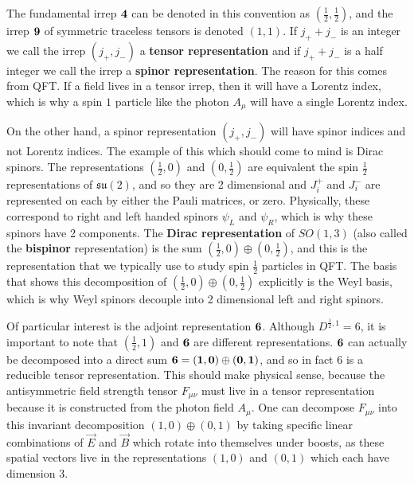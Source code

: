 \documentclass[11pt, oneside]{article}   	%
\theoremstyle{definition}
\begin{document}
The fundamental irrep $\bf 4$ can be denoted in this convention as $(\frac{1}{2}, \frac{1}{2})$, and the irrep 
$\bf 9$ of symmetric traceless tensors is denoted $(1, 1)$. If $j_+ + j_-$ is an integer we call the irrep $(j_+, j_-)$ a \textbf{tensor 
representation} and if $j_+ + j_-$ is a half integer we call the irrep a \textbf{spinor representation}. The reason for this comes 
from QFT. If a field lives in a tensor irrep, then it will have a Lorentz index, which is why a spin $1$ particle like the photon 
$A_\mu$ will have a single Lorentz index. 

On the other hand, a spinor representation $(j_+, j_-)$ will have spinor indices and not Lorentz indices. The example of this 
which should come to mind is Dirac spinors. The representations $(\frac{1}{2}, 0)$ and $(0, \frac{1}{2})$ are equivalent 
the spin $\frac{1}{2}$ representations of $\mathfrak{su}(2)$, and so they are 2 dimensional and $J_i^+$ and $J_i^-$ 
are represented on each by either the Pauli matrices, or zero. Physically, these correspond to right and left handed 
spinors $\psi_L$ and $\psi_R$, which is why these spinors have 2 components. The \textbf{Dirac representation} 
of $SO(1, 3)$ (also called the \textbf{bispinor} representation) is the sum $(\frac{1}{2}, 0)\oplus (0, \frac{1}{2})$, 
and this is the representation that we typically use to study spin $\frac{1}{2}$ particles in QFT. The basis that shows 
this decomposition of $(\frac{1}{2}, 0)\oplus (0, \frac{1}{2})$ explicitly is the Weyl basis, which is why Weyl spinors 
decouple into 2 dimensional left and right spinors. 

Of particular interest is the adjoint representation $\bf 6$. Although $D^{\frac{1}{2}, 1} = 6$, it is important to note that 
$(\frac{1}{2}, 1)$ and $\bf 6$ are different representations. $\bf 6$ can actually be decomposed into a direct sum $\bf 6 = (1, 
0)\oplus (0, 1)$, and so in fact $6$ is a reducible tensor representation. This should make physical sense, because the 
antisymmetric field strength tensor $F_{\mu\nu}$ must live in a tensor representation because it is constructed from the 
photon field $A_\mu$. One can decompose $F_{\mu\nu}$ into this invariant decomposition $(1, 0)\oplus (0, 1)$ by 
taking specific linear combinations of $\vec E$ and $\vec B$ which rotate into themselves under boosts, as these spatial 
vectors live in the representations $(1, 0)$ and $(0, 1)$ which each have dimension 3. 
\end{document}
